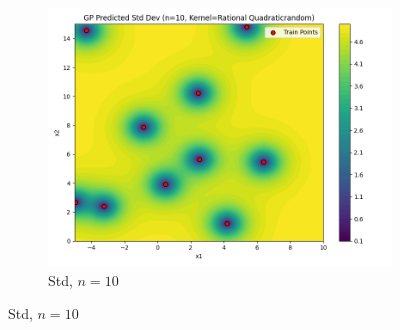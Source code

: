 \documentclass[a4paper,12pt]{article}
\begin{document}
\begin{figure}[H]
\begin{subfigure}{0.3\textwidth}
    \includegraphics[width=\linewidth]{Task-02/images/gp_std_rational_quadratic_n10_random.png}
    \caption{Std, $n=10$}
\end{subfigure}


\end{figure}
\end{document}
